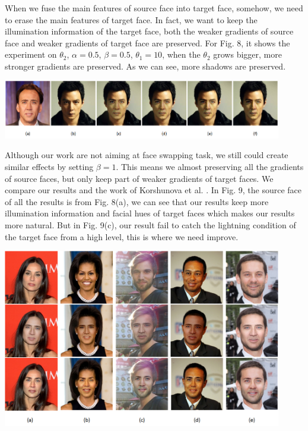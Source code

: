 When we fuse the main features of source face into target face, somehow, we need to erase the main features of target face. In fact, we want to keep the illumination information of the target face, both the weaker gradients of source face and weaker gradients of target face are preserved. For Fig. 8, it shows the experiment on $\theta_2$,  $\alpha = 0.5$, $\beta = 0.5$, $\theta_1 = 10$, when the $\theta_2$ grows bigger, more stronger gradients are preserved. As we can see, more shadows are preserved.

\begin{center}
    \includegraphics[width=4.8in]{images/thd2.png}
\end{center}

Although our work are not aiming at face swapping task, we still could create similar effects by setting $\beta = 1$.
% 
This means we almost preserving all the gradients of source faces, but only keep part of weaker gradients of target faces. We compare our results and the work of Korshunova et al. \cite{faceswapping}. In Fig. 9, the source face of all the results is from Fig. 8(a), we can see that our results keep more illumination information and facial hues of target faces which makes our results more natural. But in Fig. 9(c), our result fail to catch the lightning condition of the target face from a high level, this is where we need improve.

\begin{center}
    \includegraphics[width=4.8in]{images/vs.png}
\end{center}

